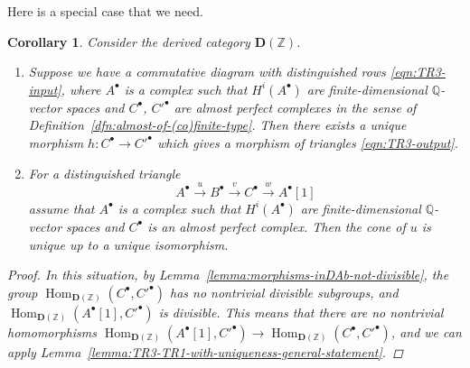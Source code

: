 \documentclass[leqno,12pt]{article}
\theoremstyle{plain}
\newtheorem{corollary}[theorem]{\indent\sc Corollary}
\theoremstyle{definition}
\DeclareMathOperator{\Hom}{Hom}
\newcommand{\QQ}{\mathbb{Q}}
\newcommand{\ZZ}{\mathbb{Z}}
\newcommand{\DZ}{{\mathbf{D} (\ZZ)}}
\begin{document}
Here is a special case that we need.

\begin{corollary}
  \label{cor:TR3-TR1-with-uniqueness}
  Consider the derived category $\DZ$.

  \begin{enumerate}
  \item[$1)$] Suppose we have a commutative diagram with distinguished rows
    \eqref{eqn:TR3-input}, where $A^\bullet$ is a complex such that
    $H^i (A^\bullet)$ are finite-dimensional $\QQ$-vector spaces and
    $C^\bullet$, $C'^\bullet$ are almost perfect complexes in the sense of
    Definition~{\rm\ref{dfn:almost-of-(co)finite-type}}. Then there exists a
    unique morphism ${h\colon C^\bullet \to C'^\bullet}$ which gives a morphism
    of triangles \eqref{eqn:TR3-output}.

  \item[$2)$] For a distinguished triangle
    $$A^\bullet \xrightarrow{u} B^\bullet \xrightarrow{v} C^\bullet \xrightarrow{w} A^\bullet[1]$$
    assume that $A^\bullet$ is a complex such that $H^i (A^\bullet)$ are
    finite-dimensional $\QQ$-vector spaces and $C^\bullet$ is an almost perfect
    complex. Then the cone of $u$ is unique up to a unique isomorphism.
  \end{enumerate}

  \begin{proof}
    In this situation, by Lemma~\ref{lemma:morphisms-inDAb-not-divisible}, the
    group $\Hom_\DZ (C^\bullet, C'^\bullet)$ has no nontrivial divisible
    subgroups, and $\Hom_\DZ (A^\bullet [1], C'^\bullet)$ is divisible. This
    means that there are no nontrivial homomorphisms
    $\Hom_\DZ (A^\bullet [1], C'^\bullet) \to \Hom_\DZ (C^\bullet, C'^\bullet)$,
    and we can apply
    Lemma~\ref{lemma:TR3-TR1-with-uniqueness-general-statement}.
  \end{proof}
\end{corollary}
\end{document}
